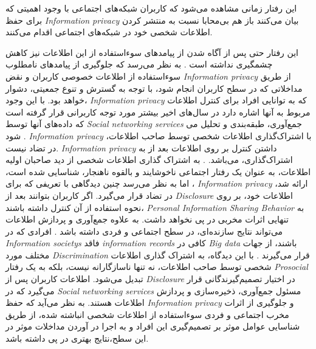 این رفتار زمانی مشاهده می‌شود که کاربران شبکه‌های اجتماعی با وجود اهمیتی که برای حفظ
\textit{
  \gls{Information privacy}
}
بیان می‌کنند باز هم بی‌محابا نسبت به  منتشر کردن اطلاعات شخصی خود
در شبکه‌های اجتماعی اقدام می‌کنند.

این رفتار حتی پس از آگاه شدن از
پیامدهای سوءاستفاده از این اطلاعات نیز کاهش چشمگیری نداشته است
\!\citep{hermesWhoQuitsPrivacyInvasive2021,wirthLazinessExplanationPrivacy2022}.
به نظر می‌رسد که جلوگیری از پیامدهای  نامطلوب سوءاستفاده از اطلاعات خصوصی کاربران و نقض
\textit{
  \gls{Information privacy}
}
از طریق مداخلاتی که در سطح کاربران انجام شود، با توجه به گسترش و تنوع جمعیتی،
دشوار خواهد بود. با این وجود،
\textit{
  \gls{Information privacy}
}
که به توانایی افراد
برای کنترل اطلاعات مربوط به آنها اشاره دارد
در سال‌های اخیر بیشتر مورد توجه کاربرانی قرار گرفته است
که داده‌های آنها توسط
\textit{
  \glspl{Social networking service}
}
جمع‌آوری، طبقه‌بندی و تحلیل می شود
\!.
\textit{
  \gls{Information privacy}
}
با اشتراک‌گذاری اطلاعات شخصی توسط صاحب اطلاعات، در تضاد نیست.
\textit{
  \gls{Information privacy}
}
داشتن کنترل بر روی اطلاعات بعد از به  اشتراک‌گذاری، می‌باشد.
.
به اشتراک گذاری اطلاعات شخصی از دید صاحبان اولیه اطلاعات،
به عنوان یک رفتار اجتماعی ناخوشایند و بالقوه ناهنجار، شناسایی شده است،
،
اما به نظر می‌رسد چنین دیدگاهی با تعریفی که برای
\textit{
  \gls{Information privacy}
}
ارائه شد، در تضاد قرار می‌گیرد. اگر کاربران بتوانند بعد از
\textit{
  \gls{Disclosure}
}
اطلاعات خود، بر روی نحوه استفاده از آن کنترل داشته باشند،
\textit{
  \gls{Personal Information Sharing Behavior}
}
به تنهایی
اثرات مخربی در پی نخواهد داشت.  به علاوه
جمع‌آوری و پردازش اطلاعات می‌تواند نتایج سازنده‌ای، در سطح
اجتماعی و فردی داشته باشد
\!\citep{rockenbachProvidingPersonalInformation2020}.
افرادی که در
\textit{
  \glspl{Information society}
}
فاقد
\textit{
  \glspl{information record}
}
کافی در
\textit{
  \gls{Big data}
}
باشند، از جهات مختلف مورد
\textit{
  \gls{Discrimination}
}
قرار می‌گیرند
\!\citep{favarettoBigDataDiscrimination2019,lermanBigDataIts2013}.
با این دیدگاه، به اشتراک گذاری اطلاعات شخصی توسط صاحب اطلاعات، نه تنها
ناسازگارانه نیست، بلکه به یک رفتار
\textit{
  \gls{Prosocial}
}
تبدیل می‌شود. اطلاعات کاربران پس از
\textit{
  \gls{Disclosure}
}
در اختیار تصمیم‌گیرندگانی قرار می‌گیرد که در
\textit{
  \glspl{Social networking service}
}
مسئول جمع‌آوری، ذخیره‌سازی و پردازش اطلاعات هستند. به نظر می‌آید که حفظ
\textit{
  \gls{Information privacy}
}
و جلوگیری از اثرات مخرب اجتماعی و فردی سوءاستفاده از
اطلاعات شخصی انباشته شده، از طریق شناسایی عوامل موثر
بر تصمیم‌گیری این افراد و به اجرا در آوردن
مداخلات موثر در این سطح،نتایج بهتری در پی داشته باشد.

